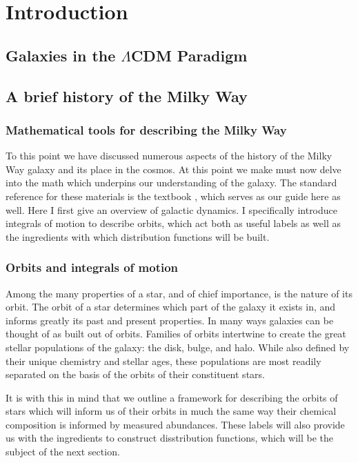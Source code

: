 \chapter{Introduction}



\section{Galaxies in the $\Lambda$CDM Paradigm}

\section{A brief history of the Milky Way}

\subsection{Mathematical tools for describing the Milky Way}

To this point we have discussed numerous aspects of the history of the Milky Way galaxy and its place in the cosmos. At this point we make must now delve into the math which underpins our understanding of the galaxy. The standard reference for these materials is the textbook \cite{binney08}, which serves as our guide here as well. Here I first give an overview of galactic dynamics. I specifically introduce integrals of motion to describe orbits, which act both as useful labels as well as the ingredients with which distribution functions will be built.

\subsection{Orbits and integrals of motion}

Among the many properties of a star, and of chief importance, is the nature of its orbit. The orbit of a star determines which part of the galaxy it exists in, and informs greatly its past and present properties. In many ways galaxies can be thought of as built out of orbits. Families of orbits intertwine to create the great stellar populations of the galaxy: the disk, bulge, and halo. While also defined by their unique chemistry and stellar ages, these populations are most readily separated on the basis of the orbits of their constituent stars.

It is with this in mind that we outline a framework for describing the orbits of stars which will inform us of their orbits in much the same way their chemical composition is informed by measured abundances. These labels will also provide us with the ingredients to construct disstribution functions, which will be the subject of the next section.

